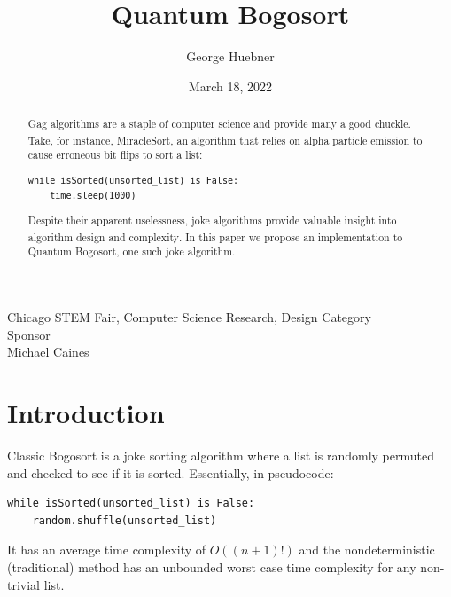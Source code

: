 \documentclass[12pt]{article}
\title{Quantum Bogosort}
\author{George Huebner}
\date{March 18, 2022}
\begin{document}

\begin{titlepage}
\maketitle
\centering
\large Chicago STEM Fair, Computer Science Research, Design Category \\
\vspace{3em}
\huge Sponsor \\
\vspace{1em}
\large Michael Caines \hspace{15em}
\end{titlepage}

{
\hypersetup{hidelinks}
\tableofcontents
}
\pagebreak

\pagestyle{fancy}
\fancyhead[L]{}


\begin{abstract}
\noindent Gag algorithms are a staple of computer science and provide many a good chuckle. Take, for instance, MiracleSort\textsuperscript{\cite{thompson_2013}}, an algorithm that relies on alpha particle emission to cause erroneous bit flips to sort a list:
\begin{verbatim}
while isSorted(unsorted_list) is False:
    time.sleep(1000)
\end{verbatim}
Despite their apparent uselessness, joke algorithms provide valuable insight into algorithm design and complexity\textsuperscript{\cite{gruber_holzer_ruepp_2007}}. In this paper we propose an implementation to Quantum Bogosort, one such joke algorithm.
\end{abstract}

\section{Introduction}

Classic Bogosort is a joke sorting algorithm where a list is randomly permuted and checked to see if it is sorted. Essentially, in pseudocode:

\begin{verbatim}
while isSorted(unsorted_list) is False:
    random.shuffle(unsorted_list)
\end{verbatim}

\noindent It has an average time complexity of $ O((n+1)!) $ and the nondeterministic (traditional) method has an unbounded worst case time complexity for any non-trivial list.
\end{document}
